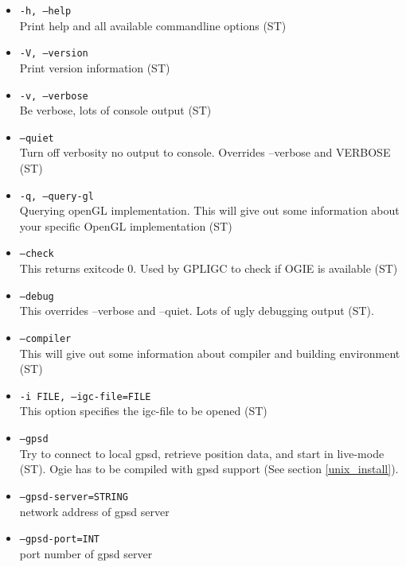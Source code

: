 \begin{itemize}

\item \texttt{-h, --help} \\
Print help and all available commandline options (ST)

\item \texttt{-V, --version} \\
Print version information (ST)

\item \texttt{-v, --verbose} \\
Be verbose, lots of console output (ST)

\item \texttt{--quiet} \\
Turn off verbosity no output to console. Overrides --verbose and VERBOSE (ST)

\item \texttt{-q, --query-gl} \\
Querying openGL implementation. This will give out some information about your specific OpenGL implementation (ST)

\item \texttt{--check} \\
This returns exitcode 0. Used by GPLIGC to check if OGIE is available (ST)

\item \texttt{--debug} \\
This overrides --verbose and --quiet. Lots of ugly debugging output (ST).

\item \texttt{--compiler} \\
This will give out some information about compiler and building environment (ST)

\item \texttt{-i FILE, --igc-file=FILE} \\
This option specifies the igc-file to be opened (ST)

\item \texttt{--gpsd} \\
Try to connect to local gpsd, retrieve position data, and start in live-mode (ST).
Ogie has to be compiled with gpsd support (See section \ref{unix_install}).

\item \texttt{--gpsd-server=STRING} \\
network address of gpsd server
      
\item \texttt{--gpsd-port=INT} \\
port number of gpsd server



\end{itemize}
